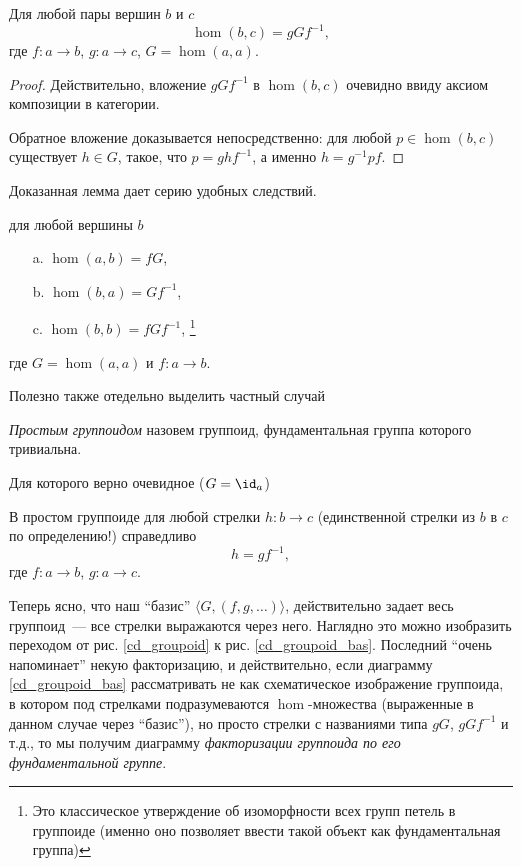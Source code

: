     \begin{lemma} Для любой пары вершин $b$ и $c$
            \[\hom(b,c) = gGf^{-1},\] 
        где $f : a \to b$, $g : a \to c$, $G = \hom(a,a)$.
    \end{lemma}
    \begin{proof}
        Действительно, вложение $gGf^{-1}$ в $\hom(b,c)$ очевидно ввиду аксиом композиции в 
        категории.

        Обратное вложение доказывается непосредственно: для любой 
        $p \in \hom(b,c)$ существует $h \in G$, такое, что 
        $p = ghf^{-1}$, а именно $h = g^{-1}pf$.
    \end{proof}

    Доказанная лемма дает серию удобных следствий.
    \begin{corollary} для любой вершины $b$
        \begin{itemize}
            \item[a.] $\hom(a,b) = fG$,
            \item[b.] $\hom(b,a) = Gf^{-1}$,
            \item[c.] $\hom(b,b) = fGf^{-1}$, \footnote{Это классическое утверждение об изоморфности 
            всех групп петель в группоиде (именно оно позволяет ввести такой объект как фундаментальная группа)}
        \end{itemize}
        где $G = \hom(a,a)$ и $f : a \to b$.
    \end{corollary}

    Полезно также отедельно выделить частный случай
    \begin{definition}
        \emph{Простым группоидом} назовем группоид, фундаментальная группа 
        которого тривиальна.
    \end{definition}
    Для которого верно очевидное ($G = \id_a$)
    \begin{corollary}
        В простом группоиде для любой стрелки $h : b \to c$ 
        (единственной стрелки из $b$ в $c$ по определению!) справедливо 
        \[h = gf^{-1},\]
        где $f: a \to b$, $g: a \to c$.
    \end{corollary}

    Теперь ясно, что наш ``базис'' $\langle G, (f,g,\ldots) \rangle$, действительно задает весь 
    группоид~--- все стрелки выражаются через него. Наглядно это можно 
    изобразить переходом от рис. \ref{cd_groupoid} к рис. \ref{cd_groupoid_bas}. 
    Последний ``очень напоминает'' некую факторизацию, и действительно, если 
    диаграмму \ref{cd_groupoid_bas} рассматривать не как схематическое 
    изображение группоида, в котором под стрелками подразумеваются $\hom$-множества 
    (выраженные в данном случае через ``базис''), но просто стрелки с названиями 
    типа $gG$, $gGf^{-1}$ и т.д., то мы получим диаграмму \emph{факторизации 
    группоида по его фундаментальной группе}.

